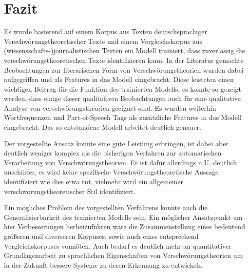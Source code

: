 \section{Fazit}

Es wurde basierend auf einem Korpus aus Texten deutschsprachiger Verschwörungstheoretischer Texte und einem Vergleichskorpus aus (wissensschafts-)journalistischen Texten ein Modell trainiert, dass zuverlässig die verschwörungstheoretischen Texte identifizieren kann.
In der Literatur gemachte Beobachtungen zur literarischen Form von Verschwörungstheorien wurden dabei aufgegriffen und als Features in das Modell eingebracht.
Diese leisteten einen wichtigen Beitrag für die Funktion des trainierten Modells, es konnte so gezeigt werden, dass einige dieser qualitativen Beobachtungen auch für eine qualitative Analyse von verschwörungstheorien geeignet sind.
Es wurden weiterhin Wortfrequenzen und Part-of-Speech Tags als zusätzliche Features in das Modell eingebracht.
Das so entstandene Modell arbeitet deutlich genauer.

Der vorgestellte Ansatz konnte eine gute Leistung erbringen, ist dabei aber deutlich weniger komplex als die bisherigen Verfahren zur automatischen Verarbeitung von Verschwörungstheorien.
Er ist dafür allerdings u.U. deutlich unschärfer, es wird keine spezifische Verschwörungstheoretische Aussage identifiziert wie dies etwa \textcite[]{samory_2018} tut, vielmehr wird ein allgemeiner verschwörungstheoretischer Stil identifiziert.

Ein mögliches Problem des vorgestellten Verfahrens könnte auch die Generalisierbarkeit des trainierten Modells sein.
Ein möglicher Ansatzpunkt um hier Verbesserungen herbeizuführen wäre die Zusammenstellung eines bedeutend größeren und diverseren Korpuses, sowie auch eines entsprechend Vergleichskorpuses vonnöten.
Auch bedarf es deutlich mehr an quantitativer Grundlagenarbeit zu sprachlichen Eigenschaften von Verschwörungstheorien um in der Zukunft bessere Systeme zu deren Erkennung zu entwickeln.

